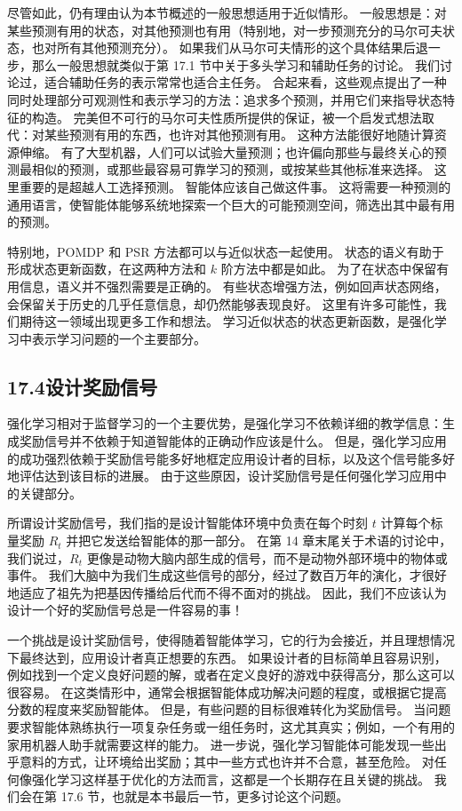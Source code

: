 \documentclass[UTF8, 12pt, fontset=fandol, oneside]{ctexart}
\begin{document}
尽管如此，仍有理由认为本节概述的一般思想适用于近似情形。
一般思想是：对某些预测有用的状态，对其他预测也有用（特别地，对一步预测充分的马尔可夫状态，也对所有其他预测充分）。
如果我们从马尔可夫情形的这个具体结果后退一步，那么一般思想就类似于第 17.1 节中关于多头学习和辅助任务的讨论。
我们讨论过，适合辅助任务的表示常常也适合主任务。
合起来看，这些观点提出了一种同时处理部分可观测性和表示学习的方法：追求多个预测，并用它们来指导状态特征的构造。
完美但不可行的马尔可夫性质所提供的保证，被一个启发式想法取代：对某些预测有用的东西，也许对其他预测有用。
这种方法能很好地随计算资源伸缩。
有了大型机器，人们可以试验大量预测；也许偏向那些与最终关心的预测最相似的预测，或那些最容易可靠学习的预测，或按某些其他标准来选择。
这里重要的是超越人工选择预测。
智能体应该自己做这件事。
这将需要一种预测的通用语言，使智能体能够系统地探索一个巨大的可能预测空间，筛选出其中最有用的预测。

特别地，POMDP 和 PSR 方法都可以与近似状态一起使用。
状态的语义有助于形成状态更新函数，在这两种方法和 $k$ 阶方法中都是如此。
为了在状态中保留有用信息，语义并不强烈需要是正确的。
有些状态增强方法，例如回声状态网络，会保留关于历史的几乎任意信息，却仍然能够表现良好。
这里有许多可能性，我们期待这一领域出现更多工作和想法。
学习近似状态的状态更新函数，是强化学习中表示学习问题的一个主要部分。

\subsection*{17.4\quad 设计奖励信号}

强化学习相对于监督学习的一个主要优势，是强化学习不依赖详细的教学信息：生成奖励信号并不依赖于知道智能体的正确动作应该是什么。
但是，强化学习应用的成功强烈依赖于奖励信号能多好地框定应用设计者的目标，以及这个信号能多好地评估达到该目标的进展。
由于这些原因，设计奖励信号是任何强化学习应用中的关键部分。

所谓设计奖励信号，我们指的是设计智能体环境中负责在每个时刻 $t$ 计算每个标量奖励 $R_t$ 并把它发送给智能体的那一部分。
在第 14 章末尾关于术语的讨论中，我们说过，$R_t$ 更像是动物大脑内部生成的信号，而不是动物外部环境中的物体或事件。
我们大脑中为我们生成这些信号的部分，经过了数百万年的演化，才很好地适应了祖先为把基因传播给后代而不得不面对的挑战。
因此，我们不应该认为设计一个好的奖励信号总是一件容易的事！

一个挑战是设计奖励信号，使得随着智能体学习，它的行为会接近，并且理想情况下最终达到，应用设计者真正想要的东西。
如果设计者的目标简单且容易识别，例如找到一个定义良好问题的解，或者在定义良好的游戏中获得高分，那么这可以很容易。
在这类情形中，通常会根据智能体成功解决问题的程度，或根据它提高分数的程度来奖励智能体。
但是，有些问题的目标很难转化为奖励信号。
当问题要求智能体熟练执行一项复杂任务或一组任务时，这尤其真实；例如，一个有用的家用机器人助手就需要这样的能力。
进一步说，强化学习智能体可能发现一些出乎意料的方式，让环境给出奖励；其中一些方式也许并不合意，甚至危险。
对任何像强化学习这样基于优化的方法而言，这都是一个长期存在且关键的挑战。
我们会在第 17.6 节，也就是本书最后一节，更多讨论这个问题。
\end{document}
